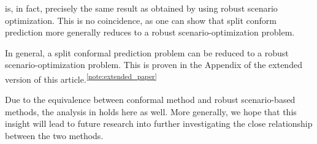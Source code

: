  is, in fact, precisely the same result as obtained by  using robust scenario optimization.
This is no coincidence, as one can show that split conform prediction more generally reduces to a robust scenario-optimization problem.
% 
\begin{remark}
    In general, a split conformal prediction problem can be reduced to a robust scenario-optimization problem. This is proven in the Appendix of the extended version of this article.\textsuperscript{\ref{note:extended_paper}}
\end{remark}
% 
Due to the equivalence between conformal method and robust scenario-based methods, the analysis in  holds here as well.
More generally, we hope that this insight will lead to future research into further investigating the close relationship between the two methods.